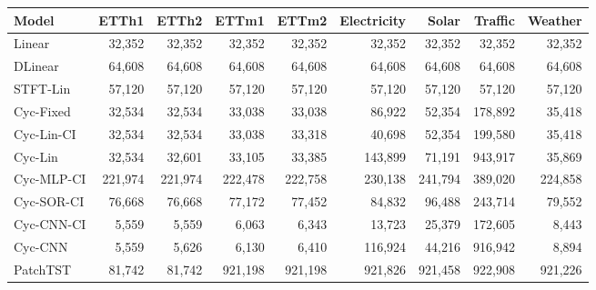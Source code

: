 \begin{tabular}{lrrrrrrrr}
\toprule
Model & ETTh1 & ETTh2 & ETTm1 & ETTm2 & Electricity & Solar & Traffic & Weather \\
\midrule
Linear & 32,352 & 32,352 & 32,352 & 32,352 & 32,352 & 32,352 & 32,352 & 32,352 \\
DLinear & 64,608 & 64,608 & 64,608 & 64,608 & 64,608 & 64,608 & 64,608 & 64,608 \\
STFT-Lin & 57,120 & 57,120 & 57,120 & 57,120 & 57,120 & 57,120 & 57,120 & 57,120 \\
Cyc-Fixed & 32,534 & 32,534 & 33,038 & 33,038 & 86,922 & 52,354 & 178,892 & 35,418 \\
Cyc-Lin-CI & 32,534 & 32,534 & 33,038 & 33,318 & 40,698 & 52,354 & 199,580 & 35,418 \\
Cyc-Lin & 32,534 & 32,601 & 33,105 & 33,385 & 143,899 & 71,191 & 943,917 & 35,869 \\
Cyc-MLP-CI & 221,974 & 221,974 & 222,478 & 222,758 & 230,138 & 241,794 & 389,020 & 224,858 \\
Cyc-SOR-CI & 76,668 & 76,668 & 77,172 & 77,452 & 84,832 & 96,488 & 243,714 & 79,552 \\
Cyc-CNN-CI & 5,559 & 5,559 & 6,063 & 6,343 & 13,723 & 25,379 & 172,605 & 8,443 \\
Cyc-CNN & 5,559 & 5,626 & 6,130 & 6,410 & 116,924 & 44,216 & 916,942 & 8,894 \\
PatchTST & 81,742 & 81,742 & 921,198 & 921,198 & 921,826 & 921,458 & 922,908 & 921,226 \\
\bottomrule
\end{tabular}